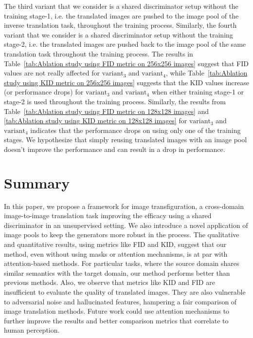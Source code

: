 \documentclass[a4paper,twoside]{article}
\begin{document}
The third variant that we consider is a shared discriminator setup without the training stage-1, i.e. the translated images are pushed to the image pool of the inverse translation task, throughout the training process. Similarly, the fourth variant that we consider is a shared discriminator setup without the training stage-2, i.e. the translated images are pushed back to the image pool of the same translation task throughout the training process. The results in Table~\ref{tab:Ablation study using FID metric on 256x256 images} suggest that FID values are not really affected for \textit{$\text{variant}_3$} and \textit{$\text{variant}_4$}, while
Table~\ref{tab:Ablation study using KID metric on 256x256 images} suggests that the KID values increase (or performance drops) for \textit{$\text{variant}_3$} and \textit{$\text{variant}_4$} when either training stage-1 or stage-2 is used throughout the training process. Similarly, the results from Table~\ref{tab:Ablation study using FID metric on 128x128 images} and \ref{tab:Ablation study using KID metric on 128x128 images} for \textit{$\text{variant}_3$} and \textit{$\text{variant}_4$} indicates that the performance drops on using only one of the training stages. We hypothesize that simply reusing translated images with an image pool doesn't improve the performance and can result in a drop in performance.
\section{Summary}
\label{Summary}
\noindent
In this paper, we propose a framework for image transfiguration, a cross-domain image-to-image translation task improving the efficacy using a shared discriminator in an unsupervised setting. We also introduce a novel application of image pools to keep the generators more robust in the process. The qualitative and quantitative results, using metrics like FID and KID, suggest that our method, even without using masks or attention mechanisms, is at par with attention-based methods. For particular tasks, where the source domain shares similar semantics with the target domain, our method performs better than previous methods. Also, we observe that metrics like KID and FID are insufficient to evaluate the quality of translated images. They are also vulnerable to adversarial noise and hallucinated features, hampering a fair comparison of image translation methods. Future work could use attention mechanisms to further improve the results and better comparison metrics that correlate to human perception.

{\small
}
\end{document}
